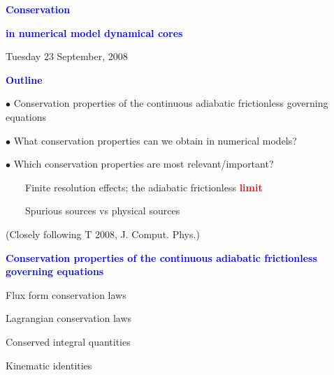 \documentclass[a4]{seminar}
\newcommand{\R}[1]{\textcolor{red}{#1}}
\newcommand{\B}[1]{\textcolor{blue}{#1}}
\begin{document}

\pagestyle{fancy}



\begin{slide}

\begin{center}

{\Large \bf
\B{Conservation}
}

\B{\bf in numerical model dynamical cores}

\end{center}

\vspace{6mm}

\begin{center}
{\small Tuesday 23 September, 2008}
\end{center}

\end{slide}


\begin{slide}


\B{\bf Outline}

\vspace{4mm}

\(\bullet\) Conservation properties of the continuous
adiabatic frictionless governing equations

\(\bullet\) What conservation properties can we obtain in numerical models?

\(\bullet\) Which conservation properties are most relevant/important?

\ \ \ \ Finite resolution effects; the adiabatic frictionless \R{\bf limit}

\ \ \ \ Spurious sources vs physical sources

\vspace{4mm}

(Closely following T 2008, J. Comput. Phys.)

\end{slide}


\begin{slide}

\B{\bf Conservation properties of the continuous
adiabatic frictionless governing equations}

\vspace{4mm}

Flux form conservation laws

\vspace{3mm}

Lagrangian conservation laws

\vspace{3mm}

Conserved integral quantities

\vspace{3mm}

Kinematic identities


\end{slide}
\end{document}
